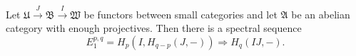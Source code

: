 Let $\mathfrak{U} \xrightarrow{J} \mathfrak{B} \xrightarrow{I} \mathfrak{W}$ be functors between small categories and let $\mathfrak{A}$ be an abelian category with enough projectives. Then there is a spectral sequence
$$E_1^{p,q} = H_p(I, H_{q-p}(J, -)) \Rightarrow H_q(IJ, -).$$
